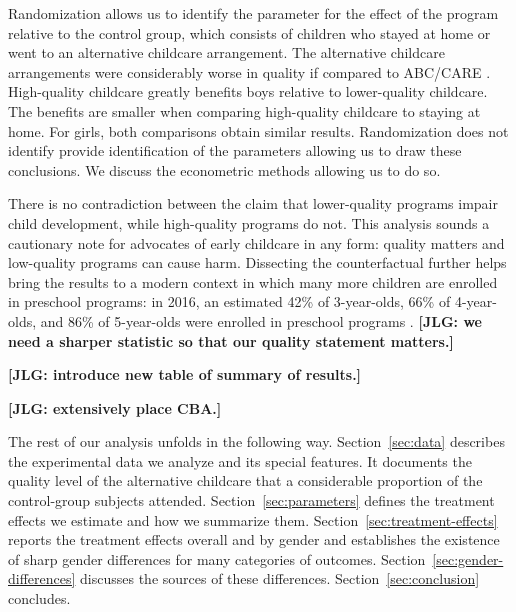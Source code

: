 Randomization allows us to identify the parameter for the effect of the program relative to the control group, which consists of children who stayed at home or went to an alternative childcare arrangement. The alternative childcare arrangements were considerably worse in quality if compared to ABC/CARE \citep{}. High-quality childcare greatly benefits boys relative to lower-quality childcare. The benefits are smaller when comparing high-quality childcare to staying at home. For girls, both comparisons obtain similar results. Randomization does not identify provide identification of the parameters allowing us to draw these conclusions. We discuss the econometric methods allowing us to do so.

There is no contradiction between the claim that lower-quality programs impair child development, while high-quality programs do not. This analysis sounds a cautionary note for advocates of early childcare in any form: quality matters and low-quality programs can cause harm. Dissecting the counterfactual further helps bring the results to a modern context in which many more children are enrolled in preschool programs: in 2016, an estimated 42\% of 3-year-olds, 66\% of 4-year-olds, and 86\% of 5-year-olds were enrolled in preschool programs \citep{NCES_2017_Education_IES}. \textbf{[JLG: we need a sharper statistic so that our quality statement matters.]}

\textbf{[JLG: introduce new table of summary of results.]}

\textbf{[JLG: extensively place CBA.]}


The rest of our analysis unfolds in the following way. Section~\ref{sec:data} describes the experimental data we analyze and its special features. It documents the quality level of the alternative childcare that a considerable proportion of the control-group subjects attended. Section~\ref{sec:parameters} defines the treatment effects we estimate and how we summarize them. Section~\ref{sec:treatment-effects} reports the treatment effects overall and by gender and establishes the existence of sharp gender differences for many categories of outcomes. Section~\ref{sec:gender-differences} discusses the sources of these differences. Section~\ref{sec:conclusion} concludes.


